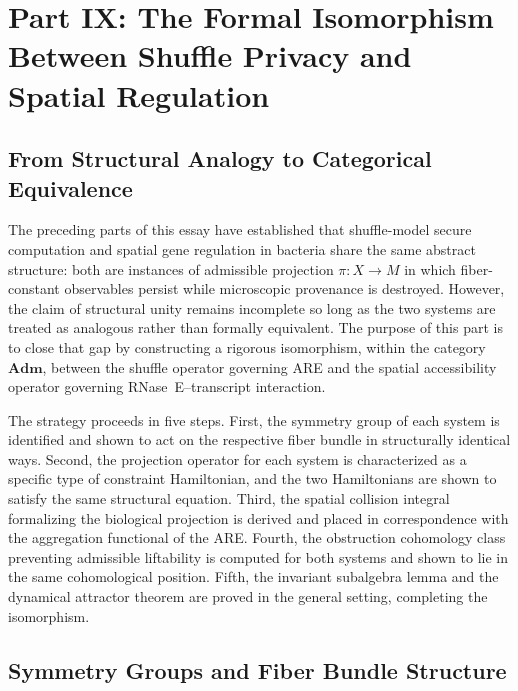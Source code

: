 \documentclass[12pt, a4paper]{article}
\theoremstyle{essaystyle}
\begin{document}
\section{Part IX: The Formal Isomorphism Between Shuffle Privacy and Spatial Regulation}

\subsection{From Structural Analogy to Categorical Equivalence}

The preceding parts of this essay have established that shuffle-model secure computation
and spatial gene regulation in bacteria share the same abstract structure: both are
instances of admissible projection $\pi : X \to M$ in which fiber-constant observables
persist while microscopic provenance is destroyed. However, the claim of structural
unity remains incomplete so long as the two systems are treated as analogous rather
than formally equivalent. The purpose of this part is to close that gap by constructing
a rigorous isomorphism, within the category $\mathbf{Adm}$, between the shuffle
operator governing ARE and the spatial accessibility operator governing RNase~E--transcript
interaction.

The strategy proceeds in five steps. First, the symmetry group of each system is
identified and shown to act on the respective fiber bundle in structurally identical
ways. Second, the projection operator for each system is characterized as a specific
type of constraint Hamiltonian, and the two Hamiltonians are shown to satisfy the same
structural equation. Third, the spatial collision integral formalizing the biological
projection is derived and placed in correspondence with the aggregation functional of
the ARE. Fourth, the obstruction cohomology class preventing admissible liftability is
computed for both systems and shown to lie in the same cohomological position. Fifth,
the invariant subalgebra lemma and the dynamical attractor theorem are proved in the
general setting, completing the isomorphism.

\subsection{Symmetry Groups and Fiber Bundle Structure}
\end{document}
